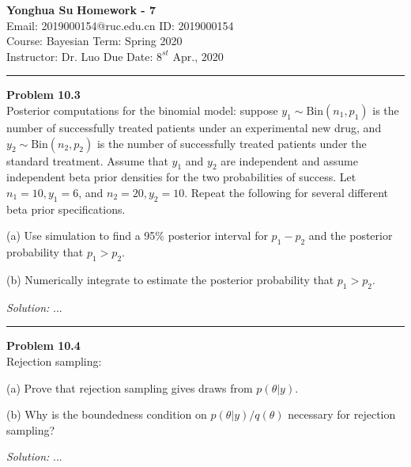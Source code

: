 \documentclass[a4paper, 11pt]{article}
\newenvironment{problem}[2][Problem]
    { \begin{mdframed}[backgroundcolor=gray!20] \textbf{#1 #2} \\}
    {  \end{mdframed}}
\newenvironment{solution}
    {\textit{Solution:}}
    {}
\begin{document}
\noindent
\large\textbf{Yonghua Su} \hfill \textbf{Homework - 7}   \\
Email: 2019000154@ruc.edu.cn \hfill ID: 2019000154 \\
\normalsize Course: Bayesian \hfill Term: Spring 2020\\
Instructor: Dr. Luo  \hfill Due Date: $8^{st}$ Apr., 2020 \\
\noindent\rule{7in}{2.8pt}



\begin{problem}{10.3}
  Posterior computations for the binomial model: suppose $y_1 \sim \text{Bin}(n_1, p_1)$ is the number of successfully treated patients under an experimental new drug, and $y_2 \sim \text{Bin}(n_2,p_2)$
  is the number of successfully treated patients under the standard treatment. Assume that $y_1$ and $y_2$ are independent and assume independent beta prior densities for the two probabilities of success. 
  Let $n_1 = 10, y_1 = 6$, and $n_2 = 20, y_2 = 10$. Repeat the following for several different beta prior specifications.

  (a) Use simulation to find a 95\% posterior interval for $p_1 - p_2$ and the posterior probability that $p_1 > p_2$.

  (b) Numerically integrate to estimate the posterior probability that $p_1 > p_2$.

\end{problem}
\begin{solution}
...
\end{solution}

\noindent\rule{7in}{2.8pt}

\begin{problem}{10.4}
  Rejection sampling:

  (a) Prove that rejection sampling gives draws from $p(\theta|y)$.

  (b) Why is the boundedness condition on $p(\theta|y)/q(\theta)$ necessary for rejection sampling?
  
\end{problem}
\begin{solution}
...
\end{solution}
\end{document}
